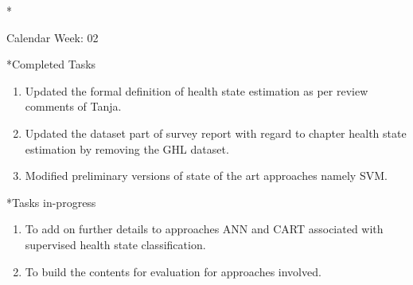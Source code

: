 \documentclass[11pt,a4paper]{article}
\begin{document}
\newpage
\begin{section}*{Calendar Week: 02 \hfill \date{15 January, 2021}}

\begin{subsection}*{Completed Tasks}
    \begin{enumerate}
        \item 
            Updated the formal definition of health state estimation as per review comments of Tanja.
        \item
            Updated the dataset part of survey report with regard to chapter health state estimation by removing the GHL dataset.
        \item
            Modified preliminary versions of state of the art approaches namely SVM.
        
    \end{enumerate}
\end{subsection}

\begin{subsection}*{Tasks in-progress}
    \begin{enumerate}
        \item
            To add on further details to approaches ANN and CART associated with supervised health state classification.
        \item
            To build the contents for evaluation for approaches involved.
        \end{enumerate}
\end{subsection}

\end{section}
\newpage
\end{document}
